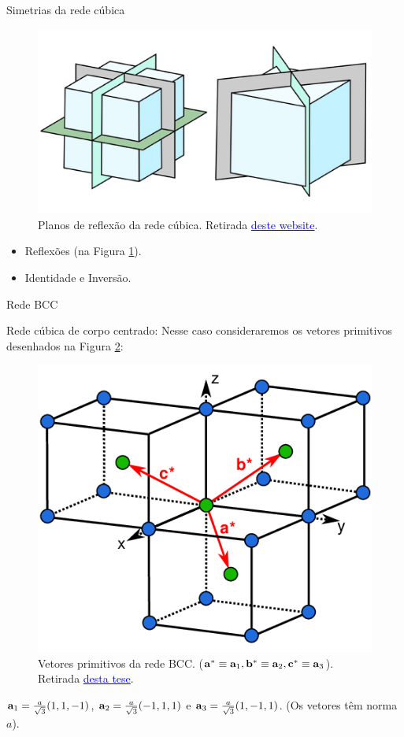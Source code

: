 \documentclass[aspectratio=169]{beamer}
\begin{document}
\begin{frame}{Simetrias da rede cúbica}

\begin{figure}[H]
\centering
\includegraphics[width=0.6\linewidth]{fig/reflex_cubic.png}
\caption{Planos de reflexão da rede cúbica. Retirada \href{https://opengeology.org/Mineralogy/10-crystal-morphology-and-symmetry/}{\textcolor{blue}{deste website}}.}
\label{fig:reflex_cubic}
\end{figure}


\begin{itemize}
\item Reflexões (na Figura \ref{fig:reflex_cubic}).
\item Identidade e Inversão.
\end{itemize}

\end{frame}




\begin{frame}{Rede BCC}

Rede cúbica de corpo centrado: Nesse caso consideraremos os vetores primitivos desenhados na Figura \ref{fig:bcc}:
\begin{figure}[H]
\centering
\includegraphics[width=0.35\linewidth]{fig/bcc.png}
\caption{Vetores primitivos da rede BCC. ($\vb{a}^{*} \equiv \vb{a}_1, \vb{b}^{*} \equiv \vb{a}_2, \vb{c}^{*} \equiv \vb{a}_3$). Retirada \href{https://www.researchgate.net/publication/264872465_Fabrication_and_characterisation_of_three-dimensional_passive_and_active_photonic_crystals}{\textcolor{blue}{desta tese}}.}
\label{fig:bcc}
\end{figure}

$\vb{a}_1 = \frac{a}{\sqrt{3}}(1, 1, -1)$, $\vb{a}_2 = \frac{a}{\sqrt{3}}(-1, 1, 1)$ e $\vb{a}_3 = \frac{a}{\sqrt{3}}(1, -1, 1)$. (Os vetores têm norma $a$).

\end{frame}
\end{document}
